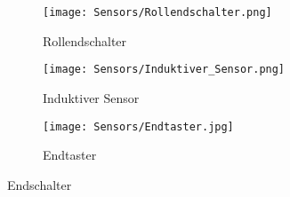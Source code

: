 \begin{figure}[H]
    \centering
    \begin{subfigure}{.3\textwidth}
        \centering
        \texttt{[image: Sensors/Rollendschalter.png]}
        \caption{Rollendschalter \cite{schmersal_pic}}
        \label{roll_sens}
    \end{subfigure}%
    \begin{subfigure}{.3\textwidth}
        \centering
        \texttt{[image: Sensors/Induktiver\_Sensor.png]}
        \caption{Induktiver Sensor \cite{induktiv_sensor}}
        \label{ind_sens}
    \end{subfigure}%
    \begin{subfigure}{.3\textwidth}
        \centering
        \texttt{[image: Sensors/Endtaster.jpg]}
        \caption{Endtaster}
        \label{tast_sens}
    \end{subfigure}
    \caption{Endschalter}
    \label{ulr}
\end{figure}

